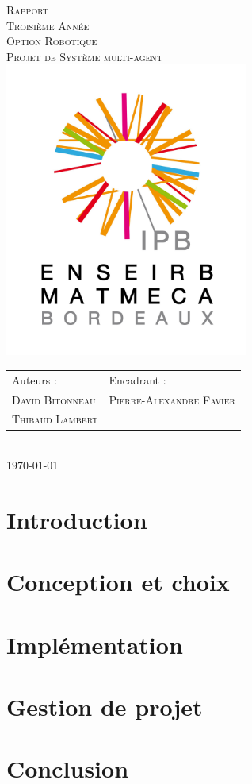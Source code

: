 \documentclass[a4paper, 11pt]{report}
\begin{document}
\begin{titlepage}
  \begin{center}
      \textsc{\huge Rapport\\[0.2cm]Troisième Année\\[0.2cm]Option
      Robotique}\\[\stretch{1}]
      \textsc{\Huge Projet de Système multi-agent}\\[\stretch{1}]
      \includegraphics[width=8cm]{logo-IPB.jpg}\\[\stretch{1}]
	\begin{tabular*}{\textwidth}{@{} m{10cm} l}
		\large{Auteurs :} & \large{Encadrant :} \\[0.5cm]
	    \textsc{\Large David Bitonneau} & \textsc{\Large Pierre-Alexandre Favier} \\
	    \textsc{\Large Thibaud Lambert}\\ 
    \end{tabular*}
	\\[2cm]
    \textsc{\Large \today}\\

\end{center}

\end{titlepage}

\clearpage
\tableofcontents
\clearpage

\chapter{Introduction}


\chapter{Conception et choix}


\chapter{Implémentation}


\chapter{Gestion de projet}


\chapter{Conclusion}

\end{document}
